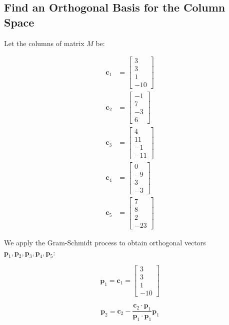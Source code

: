\documentclass{article}
\begin{document}
\subsection{Find an Orthogonal Basis for the Column Space}

Let the columns of matrix \( M \) be:

\begin{align*}
    \mathbf{c}_1 &= \begin{bmatrix} 3 \\ 3 \\ 1 \\ -10 \end{bmatrix} \\
    \mathbf{c}_2 &= \begin{bmatrix} -1 \\ 7 \\ -3 \\ 6 \end{bmatrix} \\
    \mathbf{c}_3 &= \begin{bmatrix} 4 \\ 11 \\ -1 \\ -11 \end{bmatrix} \\
    \mathbf{c}_4 &= \begin{bmatrix} 0 \\ -9 \\ 3 \\ -3 \end{bmatrix} \\
    \mathbf{c}_5 &= \begin{bmatrix} 7 \\ 8 \\ 2 \\ -23 \end{bmatrix}
\end{align*}

We apply the Gram-Schmidt process to obtain orthogonal vectors \( \mathbf{p}_1, \mathbf{p}_2, \mathbf{p}_3, \mathbf{p}_4, \mathbf{p}_5 \):

\[
\mathbf{p}_1 = \mathbf{c}_1 = \begin{bmatrix} 3 \\ 3 \\ 1 \\ -10 \end{bmatrix}
\]

\[
\mathbf{p}_2 = \mathbf{c}_2 - \frac{\mathbf{c}_2 \cdot \mathbf{p}_1}{\mathbf{p}_1 \cdot \mathbf{p}_1} \mathbf{p}_1
\]
\end{document}
